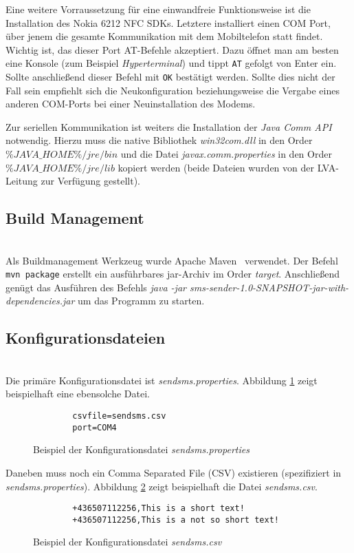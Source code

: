 \documentclass[paper=a4, fontsize=11pt]{scrartcl}
\begin{document}
Eine weitere Vorraussetzung für eine einwandfreie
Funktionsweise ist die Installation des Nokia 6212 NFC SDKs. Letztere installiert einen COM Port, über jenem die gesamte
Kommunikation mit dem Mobiltelefon statt findet. Wichtig ist, das dieser Port AT-Befehle akzeptiert. 
Dazu öffnet man am besten eine Konsole (zum Beispiel \textit{Hyperterminal}) und tippt \texttt{AT} gefolgt von Enter ein. 
Sollte anschließend dieser Befehl mit \texttt{OK} bestätigt werden. Sollte dies nicht der Fall sein empfiehlt sich 
die Neukonfiguration beziehungsweise die Vergabe eines anderen COM-Ports bei einer Neuinstallation des Modems.

Zur seriellen Kommunikation ist weiters die Installation der \textit{Java Comm API} notwendig. Hierzu muss die native Bibliothek \textit{win32com.dll} in den Order $\%JAVA\_HOME\%/jre/bin$ und die Datei \textit{javax.comm.properties} in den Order $\%JAVA\_HOME\%/jre/lib$ kopiert werden (beide Dateien wurden von der LVA-Leitung zur Verfügung gestellt).

\subsection{Build Management}~\\
Als Buildmanagement Werkzeug wurde Apache Maven~\cite{maven} verwendet. Der Befehl \texttt{mvn package} erstellt ein
ausführbares jar-Archiv im Order \textit{target}. Anschließend genügt  das Ausführen des Befehls \textit{java -jar sms-sender-1.0-SNAPSHOT-jar-with-dependencies.jar}
um das Programm zu starten. 

\subsection{Konfigurationsdateien}~\\
Die primäre Konfigurationsdatei ist \textit{sendsms.properties}.
Abbildung \ref{fig:sms-prop} zeigt beispielhaft eine ebensolche Datei.\\ 

\begin{figure}[H]
	\begin{verbatim}
		csvfile=sendsms.csv
		port=COM4
	\end{verbatim}
	\caption{Beispiel der Konfigurationsdatei \textit{sendsms.properties}}
	\label{fig:sms-prop}
\end{figure}

Daneben muss noch ein Comma Separated File (CSV) existieren (spezifiziert in \textit{sendsms.properties}). 
Abbildung \ref{fig:sms-csv} zeigt beispielhaft die Datei \textit{sendsms.csv}.\\
 \begin{figure}[H]
 	\begin{verbatim}
		+436507112256,This is a short text!
		+436507112256,This is a not so short text!
 	\end{verbatim}
 	\caption{Beispiel der Konfigurationsdatei \textit{sendsms.csv}}
 	\label{fig:sms-csv}
 \end{figure}
 
\newpage


\end{document}
